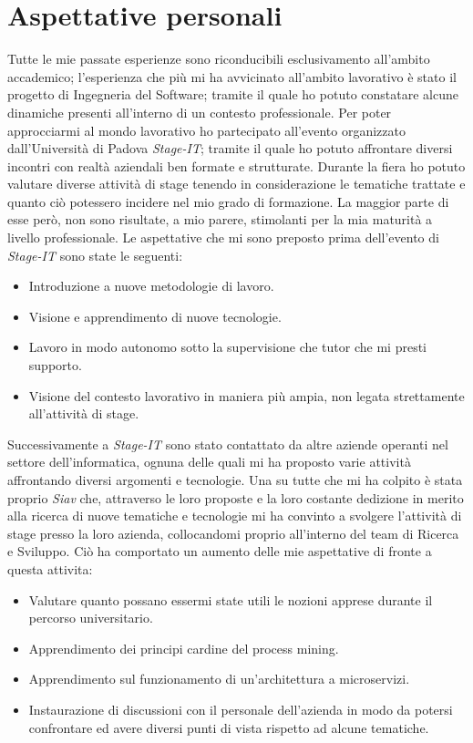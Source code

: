 \section{Aspettative personali}
Tutte le mie passate esperienze sono riconducibili esclusivamento all'ambito accademico; l'esperienza che più mi ha avvicinato all'ambito lavorativo è stato il progetto di Ingegneria del Software; tramite il quale ho potuto constatare alcune dinamiche presenti all'interno di un contesto professionale. Per poter approcciarmi al mondo lavorativo ho partecipato all'evento organizzato dall'Università di Padova \textit{\gls{Stage-IT}}; tramite il quale ho potuto affrontare diversi incontri con realtà aziendali ben formate e strutturate. Durante la fiera ho potuto valutare diverse attività di stage tenendo in considerazione le tematiche trattate e quanto ciò potessero incidere nel mio grado di formazione. La maggior parte di esse però, non sono risultate, a mio parere, stimolanti per la mia maturità a livello professionale. 
Le aspettative che mi sono preposto prima dell'evento di \textit{Stage-IT} sono state le seguenti:
\begin{itemize}
	\item Introduzione a nuove metodologie di lavoro.
	\item Visione e apprendimento di nuove tecnologie.
	\item Lavoro in modo autonomo sotto la supervisione che tutor che mi presti supporto.
	\item Visione del contesto lavorativo in maniera più ampia, non legata strettamente all'attività di stage.
\end{itemize}
Successivamente a \textit{Stage-IT} sono stato contattato da altre aziende operanti nel settore dell'informatica, ognuna delle quali mi ha proposto varie attività affrontando diversi argomenti e tecnologie.
Una su tutte che mi ha colpito è stata proprio \textit{Siav} che, attraverso le loro proposte e la loro costante dedizione in merito alla ricerca di nuove tematiche e tecnologie mi ha convinto a svolgere l'attività di stage presso la loro azienda, collocandomi proprio all'interno del team di Ricerca e Sviluppo. Ciò ha comportato un aumento delle mie aspettative di fronte a questa attivita:
\begin{itemize}
	\item Valutare quanto possano essermi state utili le nozioni apprese durante il percorso universitario.
	\item Apprendimento dei principi cardine del process mining.
	\item Apprendimento sul funzionamento di un'architettura a microservizi.
	\item Instaurazione di discussioni con il personale dell'azienda in modo da potersi confrontare ed avere diversi punti di vista rispetto ad alcune tematiche.
	
\end{itemize}
